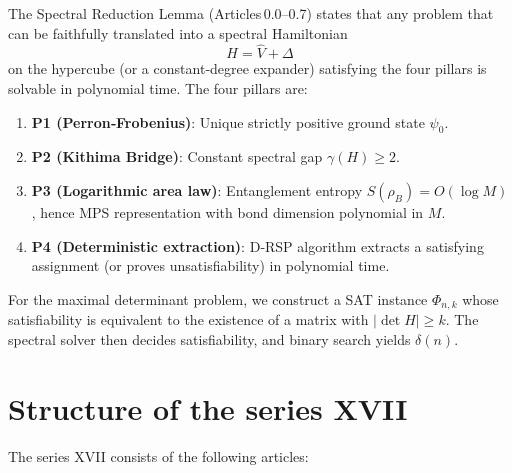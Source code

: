 \documentclass[11pt,a4paper]{article}
\begin{document}
The Spectral Reduction Lemma (Articles 0.0–0.7) states that any problem that can be faithfully translated into a spectral Hamiltonian
\[
H = \hat{V} + \Delta
\]
on the hypercube (or a constant‑degree expander) satisfying the four pillars is solvable in polynomial time. The four pillars are:

\begin{enumerate}
\item \textbf{P1 (Perron‑Frobenius)}: Unique strictly positive ground state $\psi_0$.
\item \textbf{P2 (Kithima Bridge)}: Constant spectral gap $\gamma(H) \ge 2$.
\item \textbf{P3 (Logarithmic area law)}: Entanglement entropy $S(\rho_B)=O(\log M)$, hence MPS representation with bond dimension polynomial in $M$.
\item \textbf{P4 (Deterministic extraction)}: D‑RSP algorithm extracts a satisfying assignment (or proves unsatisfiability) in polynomial time.
\end{enumerate}

For the maximal determinant problem, we construct a SAT instance $\Phi_{n,k}$ whose satisfiability is equivalent to the existence of a matrix with $|\det H| \ge k$. The spectral solver then decides satisfiability, and binary search yields $\delta(n)$.

\section{Structure of the series XVII}

The series XVII consists of the following articles:
\end{document}
